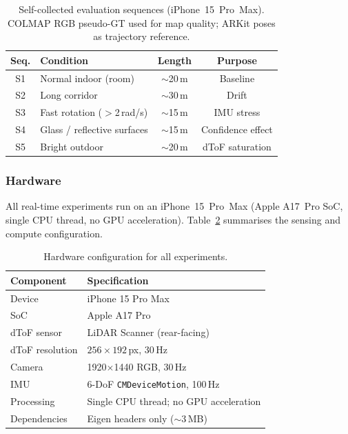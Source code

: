 \begin{table}[t]
    \centering
    \caption{Self-collected evaluation sequences (iPhone~15~Pro~Max).
    COLMAP RGB pseudo-GT used for map quality; ARKit poses as trajectory
    reference.}
    \label{tab:sequences}
    \setlength{\tabcolsep}{4pt}
    \footnotesize
    \begin{tabular}{clcc}
        \toprule
        Seq. & Condition & Length & Purpose \\
        \midrule
        S1 & Normal indoor (room) & ${\sim}$20\,m & Baseline \\
        S2 & Long corridor       & ${\sim}$30\,m & Drift \\
        S3 & Fast rotation ($>$2\,rad/s) & ${\sim}$15\,m & IMU stress \\
        S4 & Glass / reflective surfaces & ${\sim}$15\,m & Confidence effect \\
        S5 & Bright outdoor & ${\sim}$20\,m & dToF saturation \\
        \bottomrule
    \end{tabular}
\end{table}

\subsubsection{Hardware}

All real-time experiments run on an iPhone~15~Pro~Max (Apple A17~Pro SoC,
single CPU thread, no GPU acceleration).
Table~\ref{tab:hardware} summarises the sensing and compute configuration.

\begin{table}[t]
    \centering
    \caption{Hardware configuration for all experiments.}
    \label{tab:hardware}
    \setlength{\tabcolsep}{4pt}
    \footnotesize
    \begin{tabular}{ll}
        \toprule
        Component & Specification \\
        \midrule
        Device & iPhone 15 Pro Max \\
        SoC    & Apple A17 Pro \\
        dToF sensor & LiDAR Scanner (rear-facing) \\
        dToF resolution & $256 \times 192$\,px, 30\,Hz \\
        Camera & 1920$\times$1440 RGB, 30\,Hz \\
        IMU    & 6-DoF \texttt{CMDeviceMotion}, 100\,Hz \\
        Processing & Single CPU thread; no GPU acceleration \\
        Dependencies & Eigen headers only (${\sim}$3\,MB) \\
        \bottomrule
    \end{tabular}
\end{table}

